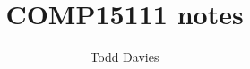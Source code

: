 \newcommand{\Author}{Todd Davies} 
\newcommand{\Title}{COMP15111 notes}

\author{\Author}
\title{\Title}